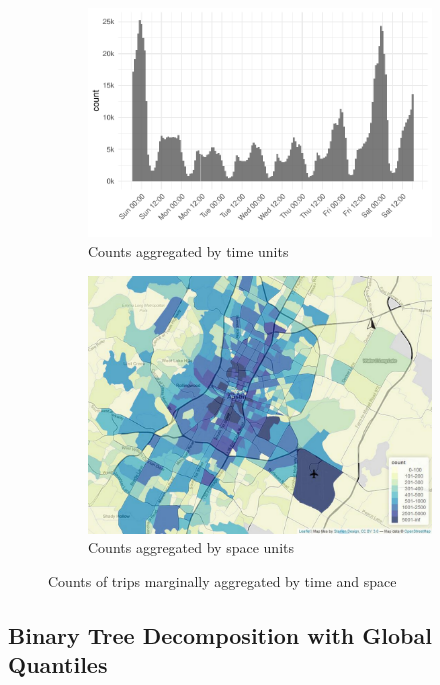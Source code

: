 \documentclass[a4paper, 11pt]{article}
\begin{document}
\begin{figure}[tb]
    \centering
    \begin{subfigure}[a]{.95\linewidth}
        \centering
        \includegraphics[width=0.7\linewidth]{img/prodhist_timely.pdf}
        \caption{Counts aggregated by time units}
        \label{fig:prod:timely}
    \end{subfigure}%
    \hfill
    \begin{subfigure}[b]{.95\linewidth}
        \centering
        \includegraphics[width=0.7\linewidth]{img/prodhist_spatial.pdf}
        \caption{Counts aggregated by space units}
        \label{fig:prod:spatial}
    \end{subfigure}%
    \caption{Counts of trips marginally aggregated by time and space} 
    \label{fig:prod_spacetime}
\end{figure}

\subsection{Binary Tree Decomposition with Global Quantiles}
\end{document}
